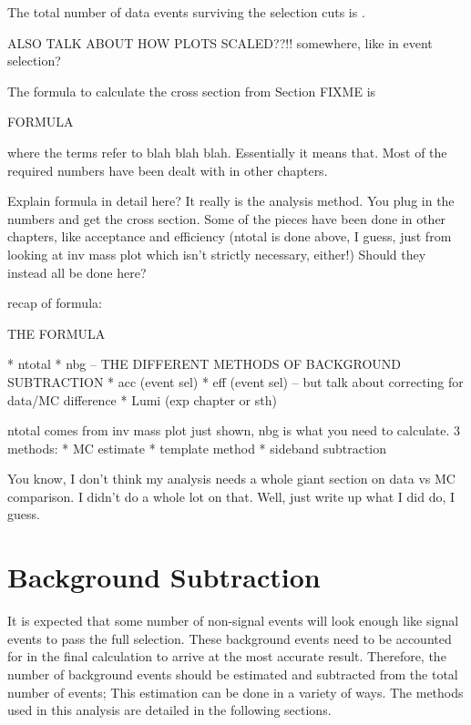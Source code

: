 The total number of data events surviving 
the selection cuts is \nevents{}. %

ALSO TALK ABOUT HOW PLOTS SCALED??!!  somewhere, like in event selection?


The formula to calculate the cross section from Section FIXME is

FORMULA

where the terms refer to blah blah blah.  
Essentially it means that. %
Most of the required numbers have been dealt with 
in other chapters.  %

Explain formula in detail here?  
It really is the analysis method.  
You plug in the numbers and get the cross section.  
Some of the pieces have been done in other 
chapters, like acceptance and efficiency 
(ntotal is done above, I guess, just from 
looking at inv mass plot which isn't strictly 
necessary, either!)  
Should they instead all be done here?  

recap of formula:

THE FORMULA

   * ntotal
   * nbg -- THE DIFFERENT METHODS OF BACKGROUND SUBTRACTION
   * acc (event sel)
   * eff (event sel) -- but talk about correcting for data/MC difference
   * Lumi (exp chapter or sth)

ntotal comes from inv mass plot just shown, nbg is what you need to calculate.
3 methods: 
   * MC estimate
   * template method
   * sideband subtraction

You know, I don't think my analysis needs a whole giant section on data vs MC comparison.  
I didn't do a whole lot on that.  
Well, just write up what I did do, I guess.  

\section{Background Subtraction}
\label{anMeth:BGSub}
It is expected that some number of non-signal events %
will look enough like signal events to pass the full selection.  
These background events need to be accounted for 
in the final calculation to arrive 
at the most accurate result.  
Therefore, the number of background events should 
be estimated and subtracted from the total number 
of events; 
This estimation can be done in a variety of ways.  
The methods used in this analysis are detailed 
in the following sections.  

